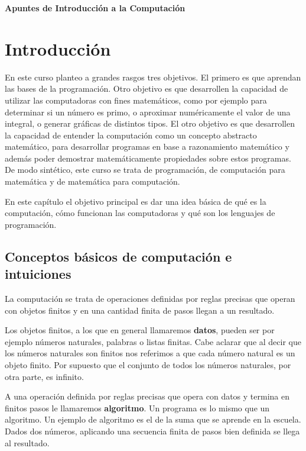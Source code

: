 \documentclass[a4paper, 12pt]{report}
\begin{document}
\centerline{\Huge\bf Apuntes de Introducción a la Computación}



\tableofcontents

\chapter{Introducción}

 En este curso planteo a grandes rasgos tres objetivos. El primero es que aprendan las bases de la programación. 
Otro objetivo es que desarrollen la capacidad de utilizar las computadoras con fines matemáticos, como por ejemplo para determinar si un número es primo, o aproximar numéricamente el valor de una integral, o generar gráficas de distintos tipos.
El otro objetivo es que desarrollen la capacidad de entender la computación como un concepto abstracto matemático, para desarrollar programas en base a razonamiento matemático y además poder demostrar matemáticamente propiedades sobre estos programas.
De modo sintético, este curso se trata de programación, de computación para matemática y de matemática para computación.

En este capítulo el objetivo principal es dar una idea básica de qué es la computación, cómo funcionan las computadoras y qué son los lenguajes de programación.



\section{Conceptos básicos de computación e intuiciones}

La computación se trata de operaciones definidas por reglas precisas que operan con objetos finitos y en una cantidad finita de pasos llegan a un resultado.

Los objetos finitos, a los que en general llamaremos {\bf datos}, pueden ser por ejemplo números naturales, palabras o listas finitas. Cabe aclarar que al decir que los números naturales son finitos nos referimos a que cada número natural es un objeto finito. Por supuesto que el conjunto de todos los números naturales, por otra parte, es infinito.

A una operación definida por reglas precisas que opera con datos y termina en finitos pasos le llamaremos {\bf algoritmo}. Un programa es lo mismo que un algoritmo. Un ejemplo de algoritmo es el de la suma que se aprende en la escuela. Dados dos números, aplicando una secuencia finita de pasos bien definida se llega al resultado.
\end{document}
